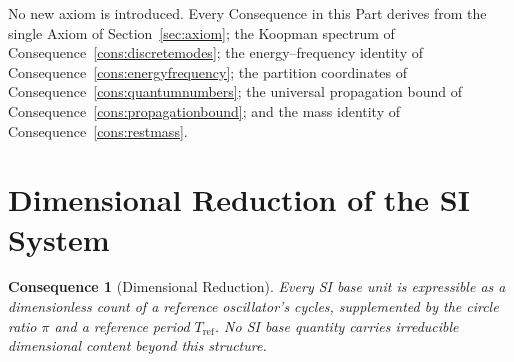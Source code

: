 \documentclass[11pt,twocolumn,a4paper]{article}
\theoremstyle{axiomstyle}
\theoremstyle{conseqstyle}
\newtheorem{consequence}{Consequence}
\theoremstyle{definition}
\theoremstyle{remark}
\begin{document}
No new axiom is introduced. Every Consequence in this Part derives from the single Axiom of Section~\ref{sec:axiom}; the Koopman spectrum of Consequence~\ref{cons:discretemodes}; the energy--frequency identity of Consequence~\ref{cons:energyfrequency}; the partition coordinates of Consequence~\ref{cons:quantumnumbers}; the universal propagation bound of Consequence~\ref{cons:propagationbound}; and the mass identity of Consequence~\ref{cons:restmass}.

\section{Dimensional Reduction of the SI System}
\label{sec:dimensionalreduction}

\begin{consequence}[Dimensional Reduction]\label{cons:dimensionalreduction}
Every SI base unit is expressible as a dimensionless count of a reference oscillator's cycles, supplemented by the circle ratio $\pi$ and a reference period $T_{\mathrm{ref}}$. No SI base quantity carries irreducible dimensional content beyond this structure.
\end{consequence}
\end{document}
